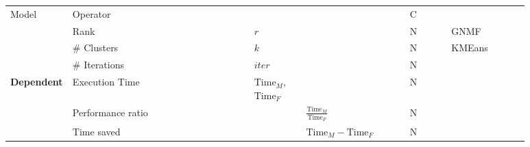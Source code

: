 \begin{tabular}{lp{0.35\linewidth}p{0.10\linewidth}>{\footnotesize}p{0.2\linewidth}p{0.08\linewidth}p{0.15\linewidth}}
\multirow[t]{4}{*}{Model} & Operator &  &  & C &  \\
 & Rank & $r$ &  & N & GNMF \\
 & \# Clusters & $k$ &  & N & KMEans \\
 & \# Iterations & $iter$ &  & N &  \\

\multirow[t]{3}{*}{\textbf{Dependent}} & Execution Time & $\text{Time}_M$, $\text{Time}_F$ &  & N &  \\
 & Performance ratio &  & $\frac{\text{Time}_M}{\text{Time}_F}$ & N &  \\
 & Time saved &  & $\text{Time}_M - \text{Time}_F$ & N &  \\

\bottomrule
\end{tabular}
